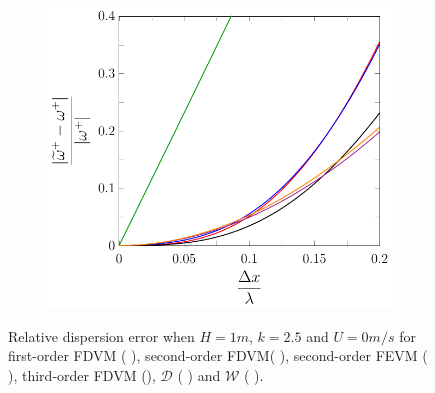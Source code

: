 \begin{figure}
\begin{subfigure}{0.5\textwidth}
	\end{subfigure}
	\par\bigskip
	\begin{subfigure}{0.5\textwidth}
		\includegraphics[width=\textwidth]{./chp4/figures/New/Dispu0Fill.pdf}
	\end{subfigure}
	\caption{Relative dispersion error when $H = 1m$, $k = 2.5$ and $U = 0m/s$ for first-order FDVM ({\color{green!60!black} \solidrule}), second-order FDVM({\color{red} \solidrule}), second-order FEVM ({\color{blue} \solidrule}), third-order FDVM ({\solidrule}), $\mathcal{D}$ ({\color{violet!80!white} \solidrule}) and $\mathcal{W}$ ({\color{orange} \solidrule}).}
	\label{fig:Dispu0Fill}
\end{figure}

